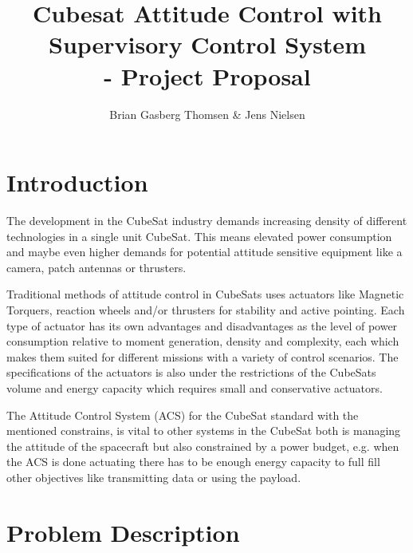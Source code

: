 \documentclass[10pt,a4paper,oneside,openany,article]{memoir}
\title{\vspace{-2cm} Cubesat Attitude Control with Supervisory Control System \\ \Large - Project Proposal}
\author{Brian Gasberg Thomsen \& Jens Nielsen}
\begin{document}
\maketitle

\chapter{Introduction}
The development in the CubeSat industry demands increasing density of different technologies in a single unit CubeSat. This means elevated power consumption and maybe even higher demands for potential attitude sensitive equipment like a camera, patch antennas or thrusters. 

Traditional methods of attitude control in CubeSats uses actuators like Magnetic Torquers, reaction wheels and/or thrusters for stability and active pointing. Each type of actuator has its own advantages and disadvantages as the level of power consumption relative to moment generation, density and complexity, each which makes them suited for different missions with a variety of control scenarios. The specifications of the actuators is also under the restrictions of the CubeSats volume and energy capacity which requires small and conservative actuators.

The Attitude Control System (ACS) for the CubeSat standard with the mentioned constrains, is vital to other systems in the CubeSat both is managing the attitude of the spacecraft but also constrained by a power budget, e.g. when the ACS is done actuating there has to be enough energy capacity to full fill other objectives like transmitting data or using the payload.




\chapter{Problem Description}

\end{document}

